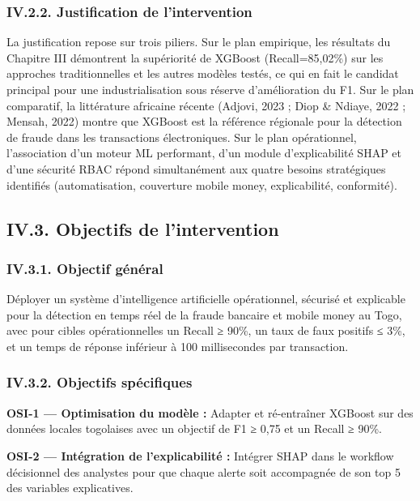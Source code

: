 \documentclass[
  12pt,
]{article}
\begin{document}
\subsubsection{IV.2.2. Justification de
l’intervention}\label{iv.2.2.-justification-de-lintervention}

La justification repose sur trois piliers. Sur le plan empirique, les
résultats du Chapitre III démontrent la supériorité de XGBoost
(Recall=85,02\%) sur les approches traditionnelles et les autres modèles
testés, ce qui en fait le candidat principal pour une industrialisation
sous réserve d’amélioration du F1. Sur le plan comparatif, la
littérature africaine récente (Adjovi, 2023 ; Diop \& Ndiaye, 2022 ;
Mensah, 2022) montre que XGBoost est la référence régionale pour la
détection de fraude dans les transactions électroniques. Sur le plan
opérationnel, l’association d’un moteur ML performant, d’un module
d’explicabilité SHAP et d’une sécurité RBAC répond simultanément aux
quatre besoins stratégiques identifiés (automatisation, couverture
mobile money, explicabilité, conformité).

\subsection{IV.3. Objectifs de
l’intervention}\label{iv.3.-objectifs-de-lintervention}

\subsubsection{IV.3.1. Objectif
général}\label{iv.3.1.-objectif-guxe9nuxe9ral}

Déployer un système d’intelligence artificielle opérationnel, sécurisé
et explicable pour la détection en temps réel de la fraude bancaire et
mobile money au Togo, avec pour cibles opérationnelles un Recall ≥ 90\%,
un taux de faux positifs ≤ 3\%, et un temps de réponse inférieur à 100
millisecondes par transaction.

\subsubsection{IV.3.2. Objectifs
spécifiques}\label{iv.3.2.-objectifs-spuxe9cifiques}

\textbf{OSI-1 — Optimisation du modèle :} Adapter et ré-entraîner
XGBoost sur des données locales togolaises avec un objectif de F1 ≥ 0,75
et un Recall ≥ 90\%.

\textbf{OSI-2 — Intégration de l’explicabilité :} Intégrer SHAP dans le
workflow décisionnel des analystes pour que chaque alerte soit
accompagnée de son top 5 des variables explicatives.
\end{document}
